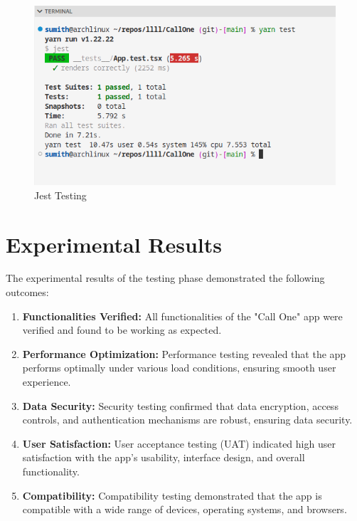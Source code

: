 \begin{enumerate}
    \begin{figure}
        \centering
        \includegraphics[width=0.90\linewidth]{Media//Chapter 6/jest.png}
        \caption{Jest Testing}
        \label{fig:JestTesting}
    \end{figure}

\end{enumerate}


\section{Experimental Results}

The experimental results of the testing phase demonstrated the following outcomes:

\begin{enumerate}
    \item \textbf{Functionalities Verified:} All functionalities of the "Call One" app were verified and found to be working as expected.
    
    \item \textbf{Performance Optimization:} Performance testing revealed that the app performs optimally under various load conditions, ensuring smooth user experience.
    
    \item \textbf{Data Security:} Security testing confirmed that data encryption, access controls, and authentication mechanisms are robust, ensuring data security.
    
    \item \textbf{User Satisfaction:} User acceptance testing (UAT) indicated high user satisfaction with the app's usability, interface design, and overall functionality.
    
    \item \textbf{Compatibility:} Compatibility testing demonstrated that the app is compatible with a wide range of devices, operating systems, and browsers.
\end{enumerate}

